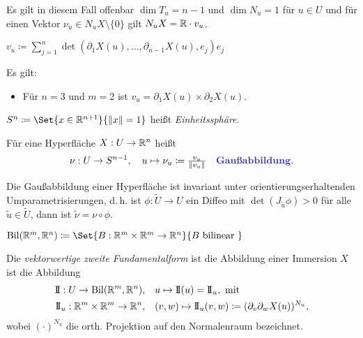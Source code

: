 \documentclass{cheat-sheet}
\newcommand{\Bil}{\mathrm{Bil}}
\newcommand{\II}{\mathrm{I\!I}}
\begin{document}
\begin{bem}
  Es gilt in diesem Fall offenbar $\dim T_u = n - 1$ und $\dim N_u = 1$ für $u \in U$ und für einen Vektor $\nu_u \in N_u X \setminus \{ 0 \}$ gilt $N_u X = \mathbb{R} \cdot v_u$.
\end{bem}

\begin{defn}
  $v_u \coloneqq \sum_{j=1}^{n} \det(\partial_1 X(u), ..., \partial_{n-1} X(u), e_j) e_j$
\end{defn}

\begin{bem}
  Es gilt:
  \begin{itemize}
    \item Für $n = 3$ und $m = 2$ ist $v_u = \partial_1 X(u) \times \partial_2 X(u)$.
  \end{itemize}
\end{bem}

\begin{nota}
  $S^{n} \coloneqq \Set{x \in \R^{n+1}}{\norm{x} = 1}$ heißt \emph{Einheitssphäre}.
\end{nota}

\begin{defn}
  Für eine Hyperfläche $X : U \to \mathbb{R}^n$ heißt
  \[
    \nu : U \to S^{n-1}, \quad u \mapsto \nu_u \coloneqq \tfrac{v_u}{\norm{v_u}}
    \quad \text{\emph{Gaußabbildung}.}
  \]
\end{defn}

\begin{satz}
  Die Gaußabbildung einer Hyperfläche ist invariant unter orientierungserhaltenden Umparametrisierungen, d.\,h. ist $\phi : \tilde{U} \to U$ ein Diffeo mit $\det(J_{\tilde{u}} \phi) > 0$ für alle $\tilde{u} \in \tilde{U}$, dann ist $\tilde{\nu} = \nu \circ \phi$.
\end{satz}


\begin{nota}
  $\Bil(\R^m, \R^n) \coloneqq \Set{ B : \R^m \times \R^m \to \R^n }{ B \text{ bilinear } }$
\end{nota}

\begin{defn}
  Die \emph{vektorwertige zweite Fundamentalform} ist die Abbildung einer Immersion $X$ ist die Abbildung
  \begin{align*}
    \II : U \to \Bil(\R^m, \R^n), \quad & u \mapsto \II(u) = \II_u, \text { mit } \\
    \II_u : \R^m \times \R^m \to \R^n, \quad & (v, w) \mapsto \II_u(v, w) \coloneqq (\partial_v \partial_w X(u))^{N_u},
  \end{align*}
  wobei $(\cdot)^{N_u}$ die orth. Projektion auf den Normalenraum bezeichnet.
\end{defn}
\end{document}
